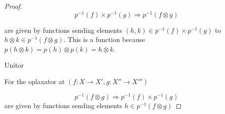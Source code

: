 \begin{proof}
$$
p^{-1}(f) \times p^{-1}(g) \Rightarrow p^{-1}(f \otimes g)
$$

are given by functions 
sending elements $(h,k)\in p^{-1}(f)\times p^{-1}(g)$ to $h\otimes k \in p^{-1}(f \otimes g)$.  This is a function because $p(h\otimes k) = p(h)\otimes p(k)= h\otimes k$.


Unitor



For the oplaxator at $(f:X\to X',g:X''\to X''')$


$$
p^{-1}(f \otimes g) \Rightarrow p^{-1}(f) \times p^{-1}(g)  
$$
are given by functions 
sending elements $h \in p^{-1}(f\otimes g)$




\end{proof}






